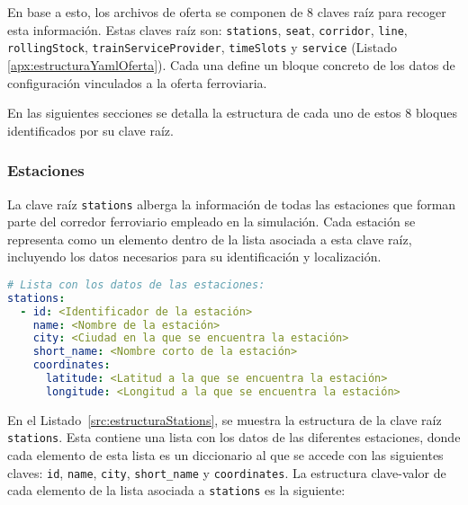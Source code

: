 En base a esto, los archivos de oferta se componen de 8 claves raíz para recoger esta información. Estas claves raíz son: \texttt{stations}, \texttt{seat}, \texttt{corridor}, \texttt{line}, \texttt{rollingStock}, \texttt{trainServiceProvider}, \texttt{timeSlots} y \texttt{service} (Listado \ref{apx:estructuraYamlOferta}). Cada una define un bloque concreto de los datos de configuración vinculados a la oferta ferroviaria.

En las siguientes secciones se detalla la estructura de cada uno de estos 8 bloques identificados por su clave raíz.

\subsubsection{Estaciones}

La clave raíz \texttt{stations} alberga la información de todas las estaciones que forman parte del corredor ferroviario empleado en la simulación. Cada estación se representa como un elemento dentro de la lista asociada a esta clave raíz, incluyendo los datos necesarios para su identificación y localización. 

\begin{lstlisting}[language=YAML,
                   frame=none,
                   numbers=none,
                   basicstyle=\ttfamily\normalsize,
                   caption={Estructura de la clave raíz \texttt{stations}},
                   label=src:estructuraStations,
                   inputencoding=utf8]
# Lista con los datos de las estaciones:
stations:
  - id: <Identificador de la estación>
    name: <Nombre de la estación>
    city: <Ciudad en la que se encuentra la estación>
    short_name: <Nombre corto de la estación>
    coordinates:
      latitude: <Latitud a la que se encuentra la estación>
      longitude: <Longitud a la que se encuentra la estación>   
\end{lstlisting}

En el Listado~\ref{src:estructuraStations}, se muestra la estructura de la clave raíz \texttt{stations}. Esta contiene una lista con los datos de las diferentes estaciones, donde cada elemento de esta lista es un diccionario al que se accede con las siguientes claves: \texttt{id}, \texttt{name}, \texttt{city}, \texttt{short\_name} y \texttt{coordinates}. La estructura clave-valor de cada elemento de la lista asociada a \texttt{stations} es la siguiente:

